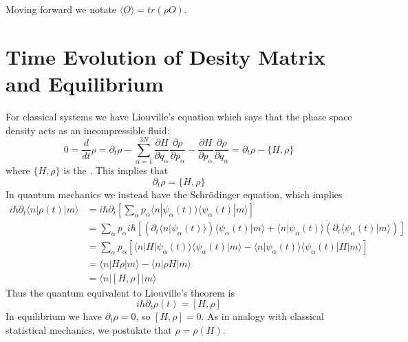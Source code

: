 \documentclass[12pt, a4paper, oneside, openright, titlepage]{book}
\begin{document}
Moving forward we notate $\langle O\rangle = tr(\rho O)$.



\section{Time Evolution of Desity Matrix and Equilibrium}

For classical systems we have Liouville's equation which says that the phase space density acts as an incompressible fluid: \begin{equation*}
    0=\frac{d}{dt}\rho = \partial_t\rho - \sum_{\alpha=1}^{3N}\frac{\partial H}{\partial q_{\alpha}}\frac{\partial \rho}{\partial p_{\alpha}} - \frac{\partial H}{\partial p_{\alpha}}\frac{\partial \rho}{\partial q_{\alpha}} = \partial_t\rho - \{H,\rho\}
\end{equation*}
where $\{H,\rho\}$ is the . This implies that \begin{equation*}
    \partial_t\rho = \{H,\rho\}
\end{equation*}
In quantum mechanics we instead have the Schr\"{o}dinger equation, which implies \begin{align*}
    i\hbar\partial_t\langle n|\rho(t)|m\rangle &= i\hbar \partial_t\left[\sum_{\alpha}p_{\alpha}\langle n|\psi_{\alpha}(t)\rangle\langle \psi_{\alpha}(t)|m\rangle\right] \\
    &= \sum_{\alpha}p_{\alpha}i\hbar\left[\left(\partial_t\langle n|\psi_{\alpha}(t)\rangle\right)\langle \psi_{\alpha}(t)|m\rangle + \langle n|\psi_{\alpha}(t)\rangle\left(\partial_t\langle \psi_{\alpha}(t)|m\rangle\right)\right] \\
    &= \sum_{\alpha}p_{\alpha}\left[\langle n|H|\psi_{\alpha}(t)\rangle\langle\psi_{\alpha}(t)|m\rangle - \langle n|\psi_{\alpha}(t)\rangle \langle \psi_{\alpha}(t)|H|m\rangle \right] \\
    &= \langle n | H\rho | m\rangle - \langle n | \rho H| m \rangle \\
    &= \langle n|[H,\rho]|m\rangle
\end{align*}
Thus the quantum equivalent to Liouville's theorem is \begin{equation*}
    i\hbar \partial_t\rho(t) = [H,\rho]
\end{equation*}
In equilibrium we have $\partial_t\rho = 0$, so $[H,\rho] = 0$. As in analogy with classical statistical mechanics, we postulate that $\rho = \rho(H)$.



\end{document}
